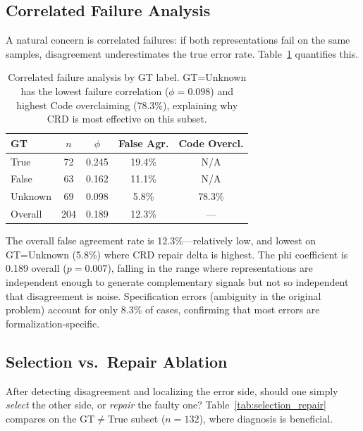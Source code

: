 \documentclass[11pt,a4paper]{article}
\begin{document}
\subsection{Correlated Failure Analysis}
\label{sec:correlated}

A natural concern is correlated failures: if both representations fail on the same samples, disagreement underestimates the true error rate. Table~\ref{tab:correlated} quantifies this.

\begin{table}[t]
\centering
\small
\begin{tabular}{lcccc}
\toprule
\textbf{GT} & $n$ & $\phi$ & \textbf{False Agr.} & \textbf{Code Overcl.} \\
\midrule
True & 72 & 0.245 & 19.4\% & N/A \\
False & 63 & 0.162 & 11.1\% & N/A \\
Unknown & 69 & 0.098 & 5.8\% & 78.3\% \\
\midrule
Overall & 204 & 0.189 & 12.3\% & --- \\
\bottomrule
\end{tabular}
\caption{Correlated failure analysis by GT label. GT=Unknown has the lowest failure correlation ($\phi\!=\!0.098$) and highest Code overclaiming (78.3\%), explaining why CRD is most effective on this subset.}
\label{tab:correlated}
\end{table}

The overall false agreement rate is 12.3\%---relatively low, and lowest on GT=Unknown (5.8\%) where CRD repair delta is highest. The phi coefficient is 0.189 overall ($p\!=\!0.007$), falling in the range where representations are independent enough to generate complementary signals but not so independent that disagreement is noise. Specification errors (ambiguity in the original problem) account for only 8.3\% of cases, confirming that most errors are formalization-specific.

\subsection{Selection vs.\ Repair Ablation}
\label{sec:selection_repair}

After detecting disagreement and localizing the error side, should one simply \emph{select} the other side, or \emph{repair} the faulty one? Table~\ref{tab:selection_repair} compares on the GT$\neq$True subset ($n\!=\!132$), where diagnosis is beneficial.
\end{document}
